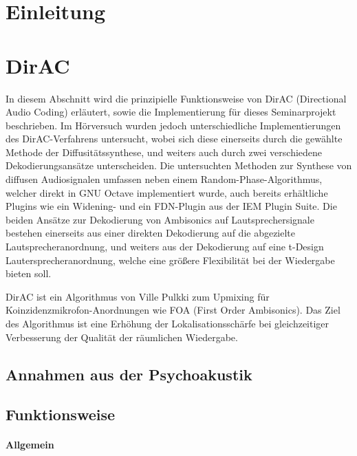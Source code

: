 \documentclass[12pt, a4paper]{article}
\begin{document}
\tableofcontents
\newpage

\section{Einleitung}


\newpage
\section{DirAC}
In diesem Abschnitt wird die prinzipielle Funktionsweise von DirAC (Directional Audio Coding) erläutert, sowie die Implementierung für dieses Seminarprojekt beschrieben. Im Hörversuch wurden jedoch unterschiedliche Implementierungen des DirAC-Verfahrens untersucht, wobei sich diese einerseits durch die gewählte Methode der Diffusitätssynthese, und weiters auch durch zwei verschiedene Dekodierungsansätze unterscheiden. Die untersuchten Methoden zur Synthese von diffusen Audiosignalen umfassen neben einem Random-Phase-Algorithmus, welcher direkt in GNU Octave implementiert wurde, auch bereits erhältliche Plugins wie ein Widening- und ein FDN-Plugin aus der IEM Plugin Suite. Die beiden Ansätze zur Dekodierung von Ambisonics auf Lautsprechersignale bestehen einerseits aus einer direkten Dekodierung auf die abgezielte Lautsprecheranordnung, und weiters aus der Dekodierung auf eine t-Design Lautersprecheranordnung, welche eine größere Flexibilität bei der Wiedergabe bieten soll.

DirAC ist ein Algorithmus von Ville Pulkki \cite{pulkki} zum Upmixing für Koinzidenzmikrofon-Anordnungen wie FOA (First Order Ambisonics). Das Ziel des Algorithmus ist eine Erhöhung der Lokalisationsschärfe bei gleichzeitiger Verbesserung der Qualität der räumlichen Wiedergabe.

\newpage

    \subsection{Annahmen aus der Psychoakustik} \label{annahmen}
    
    \subsection{Funktionsweise}
    
        \paragraph{Allgemein}
        
\end{document}

